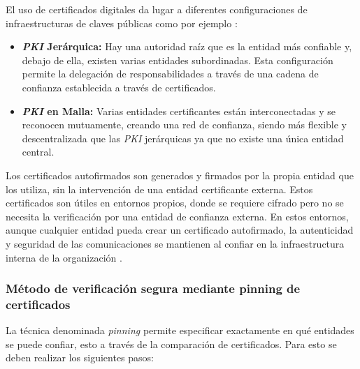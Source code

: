El uso de certificados digitales da lugar a diferentes configuraciones de infraestructuras de claves públicas como por ejemplo \cite{chokhani2003internet, linn2000trust}:
\begin{itemize}
    \item \textbf{\textit{PKI} Jerárquica:} Hay una autoridad raíz que es la entidad más confiable y, debajo de ella, existen varias entidades subordinadas. Esta configuración permite la delegación de responsabilidades a través de una cadena de confianza establecida a través de certificados.
    \item \textbf{\textit{PKI} en Malla:} Varias entidades certificantes están interconectadas y se reconocen mutuamente, creando una red de confianza, siendo más flexible y descentralizada que las \textit{PKI} jerárquicas ya que no existe una única entidad central.
\end{itemize}

Los certificados autofirmados son generados y firmados por la propia entidad que los utiliza, sin la intervención de una entidad certificante externa. Estos certificados son útiles en entornos propios, donde se requiere cifrado pero no se necesita la verificación por una entidad de confianza externa. En estos entornos, aunque cualquier entidad pueda crear un certificado autofirmado, la autenticidad y seguridad de las comunicaciones se mantienen al confiar en la infraestructura interna de la organización \cite{kumar2019security, cooper2008internet}.



\subsubsection{Método de verificación segura mediante pinning de certificados}
La técnica denominada \textit{pinning} permite especificar exactamente en qué entidades se puede confiar, esto a través de la comparación de certificados. Para esto se deben realizar los siguientes pasos:

